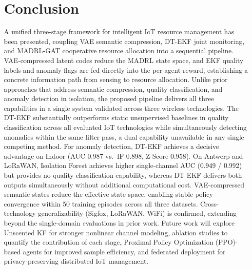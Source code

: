 \documentclass[conference]{IEEEtran}
\begin{document}
\section{Conclusion}
\label{sec:conclusion}

A unified three-stage framework for intelligent IoT resource management
has been presented, coupling VAE semantic compression, DT-EKF
joint monitoring, and MADRL-GAT cooperative resource allocation into a
sequential pipeline. VAE-compressed latent codes reduce the MADRL state
space, and EKF quality labels and anomaly flags are fed directly into
the per-agent reward, establishing a concrete information path from
sensing to resource allocation. Unlike prior approaches that address
semantic compression, quality classification, and anomaly detection in
isolation, the proposed pipeline delivers all three capabilities in a
single system validated across three wireless technologies.
The DT-EKF substantially outperforms static unsupervised
baselines in quality classification across all evaluated IoT technologies
while simultaneously detecting anomalies within the same filter pass,
a dual capability unavailable in any single competing method.
For anomaly detection, DT-EKF achieves a decisive advantage on Indoor
(AUC 0.987 vs.\ IF 0.898, Z-Score 0.958). On Antwerp and LoRaWAN,
Isolation Forest achieves higher single-channel AUC (0.949 / 0.992)
but provides no quality-classification capability, whereas DT-EKF
delivers both outputs simultaneously without additional computational cost. VAE-compressed semantic states
reduce the effective state space, enabling stable policy convergence
within 50 training episodes across all three datasets. Cross-technology
generalizability (Sigfox, LoRaWAN, WiFi) is confirmed, extending beyond
the single-domain evaluations in prior work. Future work will explore
Unscented KF for stronger nonlinear channel modeling, ablation studies
to quantify the contribution of each stage, Proximal Policy Optimization (PPO)-based agents for
improved sample efficiency, and federated deployment for
privacy-preserving distributed IoT management.
\end{document}
